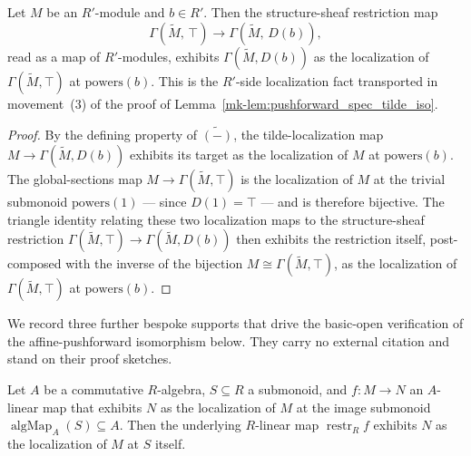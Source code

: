 \begin{lemma}\label{mk-lem:tildeRestriction_isLocalizedModule}
  \leanok

  Let \(M\) be an \(R'\)-module and \(b \in R'\). Then the structure-sheaf
  restriction map
  \[
    \Gamma(\widetilde M,\, \top) \longrightarrow \Gamma(\widetilde M,\, D(b)),
  \]
  read as a map of \(R'\)-modules, exhibits \(\Gamma(\widetilde M, D(b))\) as the
  localization of \(\Gamma(\widetilde M, \top)\) at \(\mathrm{powers}(b)\). This is
  the \(R'\)-side localization fact transported in movement~(3) of the proof of
  Lemma~\ref{mk-lem:pushforward_spec_tilde_iso}.
\end{lemma}

\begin{proof}
  \leanok

By the defining property of \(\widetilde{(-)}\), the tilde-localization map
  \(M \to \Gamma(\widetilde M, D(b))\) exhibits its target as the localization of
  \(M\) at \(\mathrm{powers}(b)\). The global-sections map
  \(M \to \Gamma(\widetilde M, \top)\) is the localization of \(M\) at the trivial
  submonoid \(\mathrm{powers}(1)\) — since \(D(1) = \top\) — and is therefore
  bijective. The triangle identity relating these two localization maps to the
  structure-sheaf restriction \(\Gamma(\widetilde M, \top) \to
  \Gamma(\widetilde M, D(b))\) then exhibits the restriction itself, post-composed
  with the inverse of the bijection \(M \cong \Gamma(\widetilde M, \top)\), as the
  localization of \(\Gamma(\widetilde M, \top)\) at \(\mathrm{powers}(b)\).
\end{proof}

We record three further bespoke supports that drive the basic-open verification of
the affine-pushforward isomorphism below. They carry no external citation and stand
on their proof sketches.

\begin{lemma}\label{mk-lem:powers_restrictScalars}
  \leanok

  Let \(A\) be a commutative \(R\)-algebra, \(S \subseteq R\) a submonoid, and
  \(f : M \to N\) an \(A\)-linear map that exhibits \(N\) as the localization of
  \(M\) at the image submonoid
  \(\operatorname{algMap}_A(S) \subseteq A\). Then the underlying \(R\)-linear map
  \(\operatorname{restr}_R f\) exhibits \(N\) as the localization of \(M\) at \(S\)
  itself.
\end{lemma}

